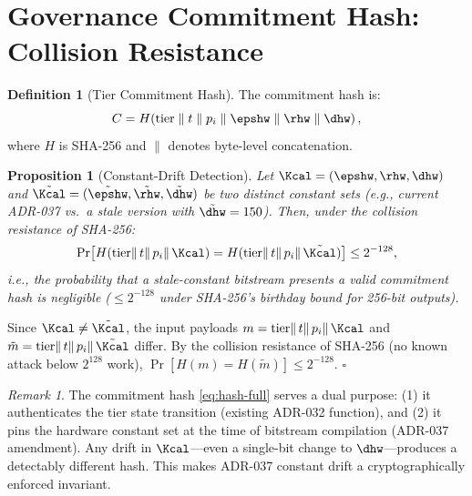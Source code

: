 \documentclass[12pt,letterpaper]{article}
\theoremstyle{plain}
\newtheorem{proposition}[theorem]{Proposition}
\theoremstyle{definition}
\newtheorem{definition}[theorem]{Definition}
\theoremstyle{remark}
\newtheorem{remark}[theorem]{Remark}
\begin{document}
\section{Governance Commitment Hash: Collision Resistance}
\label{sec:hash}

\begin{definition}[Tier Commitment Hash]
\label{def:hash}
The commitment hash is:
\begin{equation}
  C = H\!\left(\mathrm{tier} \;\|\; t \;\|\; p_i \;\|\; \epshw \;\|\; \rhw \;\|\; \dhw\right),
  \label{eq:hash-full}
\end{equation}
where \(H\) is SHA-256 and \(\|\) denotes byte-level concatenation.
\end{definition}

\begin{proposition}[Constant-Drift Detection]
\label{prop:hash}
Let \(\Kcal = (\epshw, \rhw, \dhw)\) and \(\tilde\Kcal = (\tilde\epshw, \tilde\rhw, \tilde\dhw)\)
be two distinct constant sets (e.g., current ADR-037 vs.\ a stale version
with \(\tilde\dhw = 150\)). Then, under the collision resistance of SHA-256:
\begin{equation}
  \Pr\!\left[H(\mathrm{tier}\|\,t\|\,p_i\|\,\Kcal) = H(\mathrm{tier}\|\,t\|\,p_i\|\,\tilde\Kcal)\right]
  \leq 2^{-128},
  \label{eq:collision}
\end{equation}
i.e., the probability that a stale-constant bitstream presents a valid
commitment hash is negligible (\(\leq 2^{-128}\) under SHA-256's birthday
bound for 256-bit outputs).
\end{proposition}

\begin{proofbox}
Since \(\Kcal \neq \tilde\Kcal\), the input payloads
\(m = \mathrm{tier}\|\,t\|\,p_i\|\,\Kcal\) and
\(\tilde m = \mathrm{tier}\|\,t\|\,p_i\|\,\tilde\Kcal\) differ.
By the collision resistance of SHA-256 (no known attack below
\(2^{128}\) work), \(\Pr[H(m) = H(\tilde m)] \leq 2^{-128}\). \hfill\(\square\)
\end{proofbox}

\begin{remark}
The commitment hash \cref{eq:hash-full} serves a dual purpose: (1) it
authenticates the tier state transition (existing ADR-032 function), and
(2) it pins the hardware constant set at the time of bitstream compilation
(ADR-037 amendment). Any drift in \(\Kcal\)---even a single-bit change
to \(\dhw\)---produces a detectably different hash. This makes ADR-037
constant drift a cryptographically enforced invariant.
\end{remark}
\end{document}
